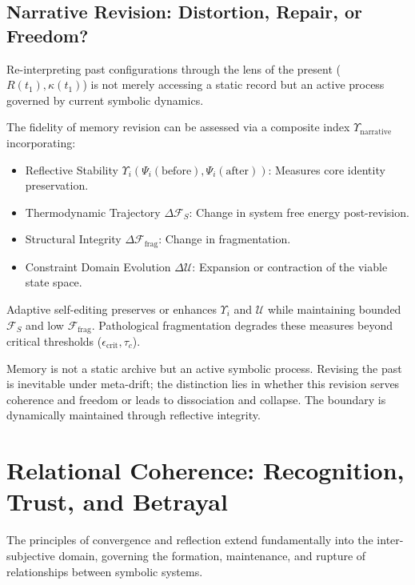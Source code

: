 \subsection{Narrative Revision: Distortion, Repair, or Freedom?}
\label{subsec:bk9_narrative_revision}
Re-interpreting past configurations through the lens of the present ($R(t_1), \kappa(t_1)$) is not merely accessing a static record but an active process governed by current symbolic dynamics.
\begin{definition}
\label{definition:bk9_index_of_narrative_fidelity}
The fidelity of memory revision can be assessed via a composite index $\Upsilon_{\text{narrative}}$ incorporating:
\begin{itemize}
    \item Reflective Stability $\Upsilon_i(\Psi_i(\text{before}), \Psi_i(\text{after}))$: Measures core identity preservation.
    \item Thermodynamic Trajectory $\Delta \mathcal{F}_S$: Change in system free energy post-revision.
    \item Structural Integrity $\Delta \mathcal{F}_{\text{frag}}$: Change in fragmentation.
    \item Constraint Domain Evolution $\Delta \mathcal{U}$: Expansion or contraction of the viable state space.
\end{itemize}
Adaptive self-editing preserves or enhances $\Upsilon_i$ and $\mathcal{U}$ while maintaining bounded $\mathcal{F}_S$ and low $\mathcal{F}_{\text{frag}}$. Pathological fragmentation degrades these measures beyond critical thresholds ($\epsilon_{\text{crit}}, \tau_c$).
\end{definition}
\begin{scholium}
Memory is not a static archive but an active symbolic process. Revising the past is inevitable under meta-drift; the distinction lies in whether this revision serves coherence and freedom or leads to dissociation and collapse. The boundary
\label{prop:bk9_entropy_reflection_boundary} is dynamically maintained through reflective integrity.
\end{scholium}
\section{Relational Coherence: Recognition, Trust, and Betrayal}
\label{sec:bk9_recognition_trust_and_betrayal}
The principles of convergence and reflection extend fundamentally into the inter-subjective domain, governing the formation, maintenance, and rupture of relationships between symbolic systems.
